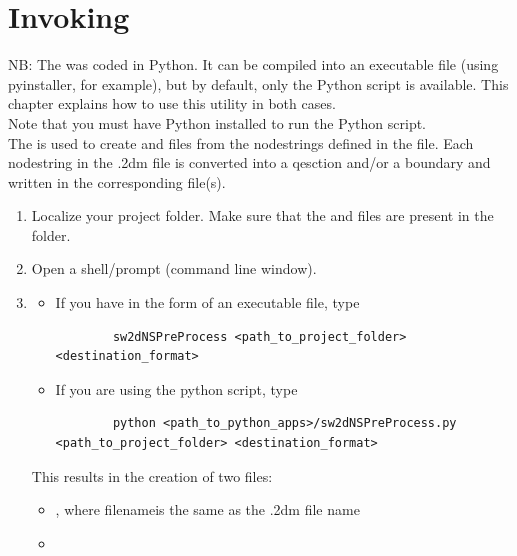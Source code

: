 \section{Invoking \swNSPreProcess}

NB: The \swNSPreProcess was coded in Python. It can be compiled into an executable file (using pyinstaller, for example), but by default, only the Python script is available. This chapter explains how to use this utility in both cases. \\
Note that you must have Python installed to run the Python script. \\

The \swNSPreProcess is used to create  and   files from the nodestrings defined in the  file.
Each nodestring in the .2dm file is converted into a qesction and/or a boundary and written in the corresponding file(s).

\begin{enumerate}
	\item Localize your project folder. Make sure that the  and  files are present in the  folder.
	\item Open a shell/prompt (command line window).
	\item \begin{itemize}
		\item If you have \swNSPreProcess in the form of an executable file, type
		\begin{small}\begin{verbatim}
		sw2dNSPreProcess <path_to_project_folder> <destination_format>
		\end{verbatim}\end{small}
		\item If you are using the python script, type
		\begin{small}\begin{verbatim}
		python <path_to_python_apps>/sw2dNSPreProcess.py <path_to_project_folder> <destination_format>
		\end{verbatim}\end{small}
	\end{itemize}
	This results in the creation of two files: \begin{itemize}
		\item {}, where \textlangle filename\textrangle  is the same as the .2dm file name
		\item {}
	\end{itemize}
\end{enumerate}
